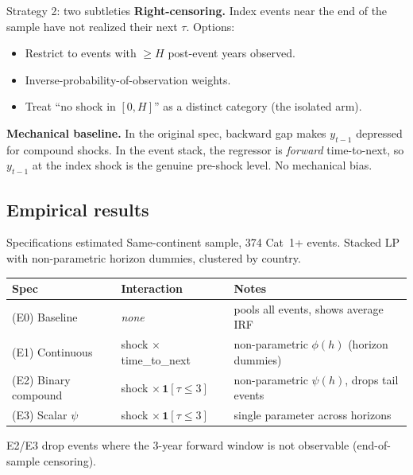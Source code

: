 \documentclass[aspectratio=169]{beamer}
\begin{document}
\begin{frame}{Strategy 2: two subtleties}
\textbf{Right-censoring.} Index events near the end of the sample have not realized their next $\tau$. Options:
\begin{itemize}
  \item Restrict to events with $\geq H$ post-event years observed.
  \item Inverse-probability-of-observation weights.
  \item Treat ``no shock in $[0,H]$'' as a distinct category (the isolated arm).
\end{itemize}

\medskip
\textbf{Mechanical baseline.} In the original spec, backward gap makes $y_{t-1}$ depressed for compound shocks. In the event stack, the regressor is \emph{forward} time-to-next, so $y_{t-1}$ at the index shock is the genuine pre-shock level. No mechanical bias.
\end{frame}

\subsection{Empirical results}
\begin{frame}\subsectionpage\end{frame}

\begin{frame}{Specifications estimated}
\footnotesize
Same-continent sample, 374 Cat~1+ events. Stacked LP with non-parametric horizon dummies, clustered by country.

\smallskip
\begin{tabular}{l l l}
\hline
\textbf{Spec} & \textbf{Interaction} & \textbf{Notes} \\
\hline
(E0) Baseline           & \emph{none}                        & pools all events, shows average IRF \\
(E1) Continuous         & shock $\times$ time\_to\_next      & non-parametric $\phi(h)$ (horizon dummies) \\
(E2) Binary compound    & shock $\times\,\mathbf{1}[\tau\leq 3]$ & non-parametric $\psi(h)$, drops tail events \\
(E3) Scalar $\psi$      & shock $\times\,\mathbf{1}[\tau\leq 3]$ & single parameter across horizons \\
\hline
\end{tabular}

\smallskip
E2/E3 drop events where the 3-year forward window is not observable (end-of-sample censoring).
\end{frame}
\end{document}
